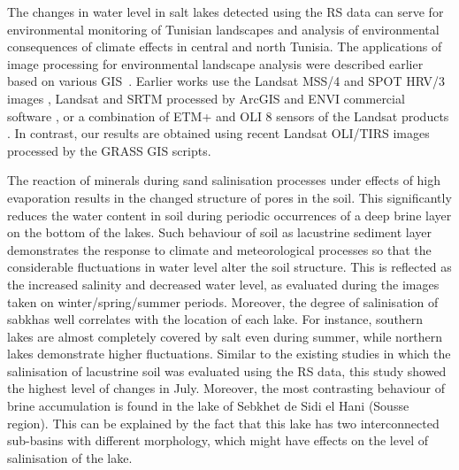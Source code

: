 \documentclass[land,article,accept,pdftex,moreauthors]{Definitions/mdpi}
\begin{document}
{The }changes in water level in salt lakes{ }detected using {the }RS data{ }can serve for environmental monitoring of Tunisian landscapes and analysis of environmental consequences of climate effects in central and north Tunisia. {The applications} of image processing {for} environmental landscape {analysis were} described earlier { based on various GIS~}\cite{Touhami,Khelifa,Hammami,Bounouh}. {Earlier} works use the Landsat MSS/4 and SPOT HRV/3 images \cite{Park}, Landsat and SRTM processed by ArcGIS and ENVI commercial software \cite{Souissi,Afrasinei}, or a combination of ETM+ and OLI 8 sensors of the Landsat products \cite{Mezned}. {In contrast, our} results{ }are obtained using{ recent }Landsat OLI/TIRS images processed by the GRASS GIS scripts. 

The reaction of {minerals during }sand salinisation processes {under effects of} high evaporation{ }results in {the }changed structure of pores in the soil{. This} significantly {reduces} the water content in soil{ }during periodic occurrences of a deep brine layer on the bottom of the lakes. Such behaviour of soil as lacustrine sediment layer demonstrates the response to climate and meteorological processes so that the considerable fluctuations in water level alter the soil structure{. This }is reflected as {the }increased salinity and decreased water level, as evaluated during {the images taken on }winter/spring/summer periods{. }Moreover, the degree of salinisation of sabkhas well correlates with the location of each lake{. For instance, } southern lakes {are} almost completely covered by salt even during summer, while northern lakes demonstrate {higher fluctuations}. Similar to {the }existing studies \cite{BAYATI2021126032,SHENG2016129,SCHRODER20221710} {in which} the salinisation of lacustrine soil {was }evaluated using {the }RS data, this study showed the highest level of changes {in }July{. Moreover, }the most contrasting behaviour of brine accumulation {is found }in the lake of Sebkhet de Sidi el Hani (Sousse region){. This can be explained by the fact that this lake} has two {interconnected} sub-basins with different morphology, {which} might have effects on {the level of }salinisation of the lake. 
\end{document}
